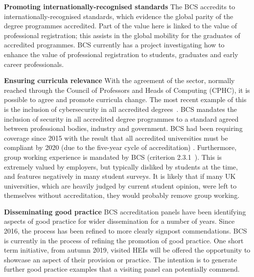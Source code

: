 \documentclass[sigconf]{acmart}
\begin{document}
{\textbf{Promoting internationally-recognised standards}} The BCS
accredits to internationally-recognised standards, which evidence the
global parity of the degree programmes accredited. Part of the value
here is linked to the value of professional registration; this assists
in the global mobility for the graduates of accredited programmes. BCS
currently has a project investigating how to enhance the value of
professional registration to students, graduates and early career
professionals.

{\textbf{Ensuring curricula relevance}} With the agreement of the
sector, normally reached through the Council of Professors and Heads
of Computing (CPHC), it is possible to agree and promote curricula
change. The most recent example of this is the inclusion of
cybersecurity in all accredited degrees~\cite{Cricketal2019}. BCS
mandates the inclusion of security in all accredited degree programmes
to a standard agreed between professional bodies, industry and
government. BCS had been requiring coverage since 2015
\cite[p.~17--18]{BCS2018a} with the result that all accredited
universities must be compliant by 2020 (due to the five-year cycle of
accreditation) \cite{Cricketal2019}. Furthermore, group working
experience is mandated by BCS (criterion 2.3.1~\cite [p31]
{BCS2018a}). This is extremely valued by employers, but typically
disliked by students at the time, and features negatively in many
student surveys. It is likely that if many UK universities, which are
heavily judged by current student opinion, were left to themselves
without accreditation, they would probably remove group working.


{\textbf{Disseminating good practice}} BCS accreditation panels have
been identifying aspects of good practice for wider dissemination for
a number of years. Since 2016, the process has been refined to more
clearly signpost commendations. BCS is currently in the process of
refining the promotion of good practice. One short term initiative,
from autumn 2019, visited HEIs will be offered the opportunity to
showcase an aspect of their provision or practice. The intention is to
generate further good practice examples that a visiting panel can
potentially commend.
\end{document}
